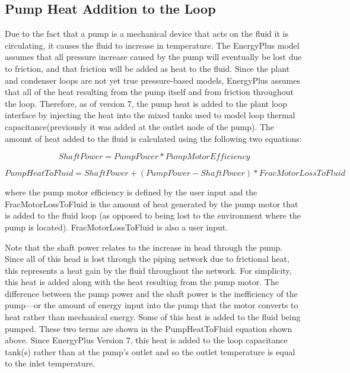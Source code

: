 \subsection{Pump Heat Addition to the Loop}\label{pump-heat-addition-to-the-loop}

Due to the fact that a pump is a mechanical device that acts on the fluid it is circulating, it causes the fluid to increase in temperature. The EnergyPlus model assumes that all pressure increase caused by the pump will eventually be lost due to friction, and that friction will be added as heat to the fluid. Since the plant and condenser loops are not yet true pressure-based models, EnergyPlus assumes that all of the heat resulting from the pump itself and from friction throughout the loop. Therefore, as of version 7, the pump heat is added to the plant loop interface by injecting the heat into the mixed tanks used to model loop thermal capacitance(previously it was added at the outlet node of the pump). The amount of heat added to the fluid is calculated using the following two equations:

\begin{equation}
ShaftPower = PumpPower * PumpMotorEfficiency
\end{equation}

\begin{equation}
PumpHeatToFluid = ShaftPower + \left( {PumpPower - ShaftPower} \right) * FracMotorLossToFluid
\end{equation}

where the pump motor efficiency is defined by the user input and the FracMotorLossToFluid is the amount of heat generated by the pump motor that is added to the fluid loop (as opposed to being lost to the environment where the pump is located). FracMotorLossToFluid is also a user input.

Note that the shaft power relates to the increase in head through the pump. Since all of this head is lost through the piping network due to frictional heat, this represents a heat gain by the fluid throughout the network. For simplicity, this heat is added along with the heat resulting from the pump motor. The difference between the pump power and the shaft power is the inefficiency of the pump---or the amount of energy input into the pump that the motor converts to heat rather than mechanical energy. Some of this heat is added to the fluid being pumped. These two terms are shown in the PumpHeatToFluid equation shown above. Since EnergyPlus Version 7, this heat is added to the loop capacitance tank(s) rather than at the pump's outlet and so the outlet temperature is equal to the inlet temperature.

